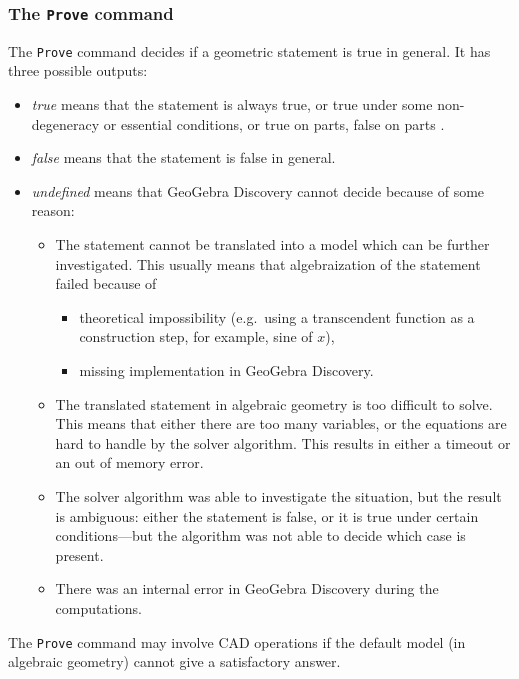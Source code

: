 \documentclass{article}
\begin{document}
\subsubsection{The \texttt{Prove} command}
The \texttt{Prove} command decides if a geometric statement is true in general. It has three possible outputs:
\begin{itemize}
    \item \textit{true} means that the statement is always true, or true under some non-degeneracy \cite{Chou,CoxLittleOShea,RecioVelez} or essential \cite{KovacsRecioSolyomGecse} conditions, or true on parts, false on parts 
\cite{BotanaRecio2016,KovacsRecioVelez}.
    \item \textit{false} means that the statement is false in general.
    \item \textit{undefined} means that GeoGebra Discovery cannot decide because of some reason:
    \begin{itemize}
        \item The statement cannot be translated into a model which can be further investigated. This usually means that algebraization of the statement failed because of 
        \begin{itemize}
            \item theoretical impossibility (e.g.~using a transcendent function as a construction step, for example, sine of $x$),
            \item missing implementation in GeoGebra Discovery.
        \end{itemize}
        \item The translated statement in algebraic geometry is too difficult to solve. This means that either there are too many variables, or the equations are hard to handle by the solver algorithm. This results in either a timeout or an out of memory error.
        \item The solver algorithm was able to investigate the situation, but the result is ambiguous: either the statement is false, or it is true under certain conditions---but the algorithm was not able to decide which case is present.
        \item There was an internal error in GeoGebra Discovery during the computations.
    \end{itemize}
\end{itemize}
The \texttt{Prove} command may involve CAD operations if the default model (in algebraic geometry) cannot give a satisfactory answer.

\end{document}
